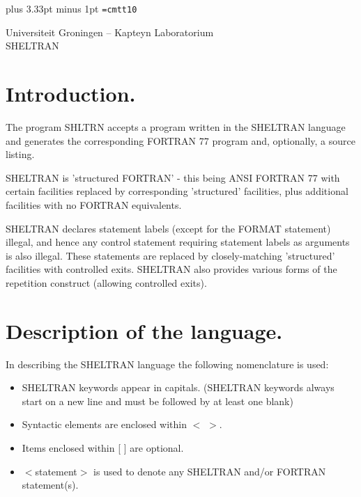 \spaceskip=3.33pt plus 3.33pt minus 1pt
\font\tt=cmtt10

\begin{titlepage}
\null
\begin{center}
{\Large Universiteit Groningen -- Kapteyn Laboratorium}\\
\vfill
{\huge SHELTRAN\\}

\end{center}
\end{titlepage}
\thispagestyle{empty}
\tableofcontents
\newpage
{}
\chapter{Introduction.}

The program SHLTRN accepts a program written in the SHELTRAN language
and generates the corresponding FORTRAN 77 program and, optionally, a
source listing. 

SHELTRAN is 'structured FORTRAN' - this being ANSI FORTRAN 77 with
certain facilities replaced by corresponding 'structured' facilities,
plus additional facilities with no FORTRAN equivalents. 

SHELTRAN declares statement labels (except for the FORMAT statement)
illegal, and hence any control statement requiring statement labels as
arguments is also illegal.  These statements are replaced by
closely-matching 'structured' facilities with controlled exits. 
SHELTRAN also provides various forms of the repetition construct
(allowing controlled exits). 

\chapter{Description of the language.}

In describing the SHELTRAN language the following nomenclature is used:

\begin{itemize}

\item SHELTRAN keywords appear in capitals.  (SHELTRAN keywords always
start on a new line and must be followed by at least one blank)

\item Syntactic elements are enclosed within $<$ $>$. 

\item Items enclosed within [ ] are optional. 

\item $<$statement$>$ is used to denote any SHELTRAN and/or FORTRAN
statement(s). 

\end{itemize}

